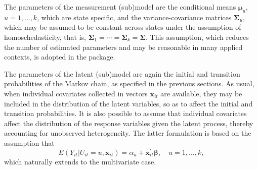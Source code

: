 The parameters of the measurement (sub)model are the conditional means
\(\boldsymbol{\mu}_u\), \(u=1,\ldots,k\), which are state specific, and the
variance-covariance matrices \(\boldsymbol{\Sigma}_u\), which may be assumed to be
constant across states under the assumption of homoschedasticity, that
is, \(\boldsymbol{\Sigma}_1 = \cdots = \boldsymbol{\Sigma}_k = \boldsymbol{\Sigma}\). This
assumption, which reduces the number of estimated parameters and may be
reasonable in many applied contexts, is adopted in the 
package.

The parameters of the latent (sub)model are again the initial and
transition probabilities of the Markov chain, as specified in the
previous sections. As usual, when individual covariates collected in
vectors \(\mathbf{x}_{it}\) are available, they may be included in the
distribution of the latent variables, so as to affect the initial and
transition probabilities. It is also possible to assume that individual
covariates affect the distribution of the response variables given the
latent process, thereby accounting for unobserved heterogeneity. The
latter formulation is based on the assumption that \[
E(Y_{it}| U_{it} = u, \boldsymbol{x}_{it}) =  {\alpha}_{u} + \boldsymbol{x}_{it}^\prime \boldsymbol{\beta},\quad u=1,\ldots,k,
\] which naturally extends to the multivariate case.

